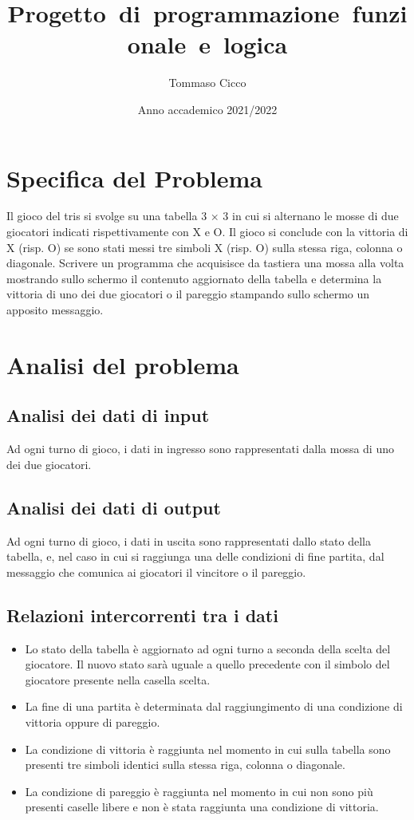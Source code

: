 \documentclass{article}
\title{Progetto~di~programmazione~funzionale~e~logica}
\author{Tommaso Cicco}
\date{\small Anno accademico 2021/2022}
\begin{document}
\maketitle
\newpage
\tableofcontents
\newpage
 
\section{Specifica del Problema}

Il gioco del tris si svolge su una tabella 3 × 3 in cui si alternano le mosse di due giocatori indicati rispettivamente con X e O. 
Il gioco si conclude con la vittoria di X (risp. O) se sono stati messi tre simboli X (risp. O) sulla stessa riga, colonna o diagonale. 
Scrivere un programma che acquisisce da tastiera una mossa alla volta mostrando sullo schermo il contenuto aggiornato della tabella 
e determina la vittoria di uno dei due giocatori o il pareggio stampando sullo schermo un apposito messaggio.
\newpage
\section{Analisi del problema}

\subsection{Analisi dei dati di input}

Ad ogni turno di gioco, i dati in ingresso sono rappresentati dalla mossa di uno dei due giocatori.
\subsection{Analisi dei dati di output}

Ad ogni turno di gioco, i dati in uscita sono rappresentati dallo stato della tabella, e, nel caso in cui si raggiunga una delle condizioni di fine partita, dal messaggio che comunica ai giocatori il vincitore o il pareggio.
\subsection{Relazioni intercorrenti tra i dati}

\begin{itemize}
    \item Lo stato della tabella è aggiornato ad ogni turno a seconda della scelta del giocatore. Il nuovo stato sarà uguale a quello precedente con il simbolo del giocatore presente nella casella scelta.
    \item La fine di una partita è determinata dal raggiungimento di una condizione di vittoria oppure di pareggio.
    \item La condizione di vittoria è raggiunta nel momento in cui sulla tabella sono presenti tre simboli identici sulla stessa riga, colonna o diagonale.
    \item La condizione di pareggio è raggiunta nel momento in cui non sono più presenti caselle libere e non è stata raggiunta una condizione di vittoria.
\end{itemize}
\newpage
\end{document}
